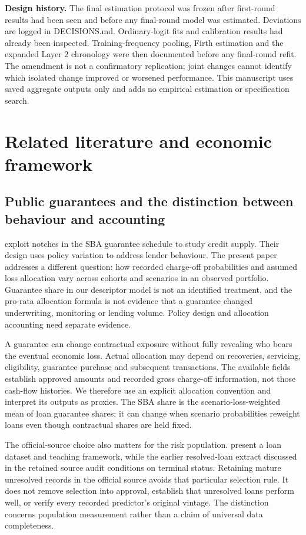 \textbf{Design history.} The final estimation protocol was frozen after first-round results had been seen and before any final-round model was estimated. Deviations are logged in DECISIONS.md. Ordinary-logit fits and calibration results had already been inspected. Training-frequency pooling, Firth estimation and the expanded Layer 2 chronology were then documented before any final-round refit. The amendment is not a confirmatory replication; joint changes cannot identify which isolated change improved or worsened performance. This manuscript uses saved aggregate outputs only and adds no empirical estimation or specification search.

\section{Related literature and economic framework}
\subsection{Public guarantees and the distinction between behaviour and accounting}
\citet{bachas2021} exploit notches in the SBA guarantee schedule to study credit supply. Their design uses policy variation to address lender behaviour. The present paper addresses a different question: how recorded charge-off probabilities and assumed loss allocation vary across cohorts and scenarios in an observed portfolio. Guarantee share in our descriptor model is not an identified treatment, and the pro-rata allocation formula is not evidence that a guarantee changed underwriting, monitoring or lending volume. Policy design and allocation accounting need separate evidence.

A guarantee can change contractual exposure without fully revealing who bears the eventual economic loss. Actual allocation may depend on recoveries, servicing, eligibility, guarantee purchase and subsequent transactions. The available fields establish approved amounts and recorded gross charge-off information, not those cash-flow histories. We therefore use an explicit allocation convention and interpret its outputs as proxies. The SBA share is the scenario-loss-weighted mean of loan guarantee shares; it can change when scenario probabilities reweight loans even though contractual shares are held fixed.

The official-source choice also matters for the risk population. \citet{li} present a loan dataset and teaching framework, while the earlier resolved-loan extract discussed in the retained source audit conditions on terminal status. Retaining mature unresolved records in the official source avoids that particular selection rule. It does not remove selection into approval, establish that unresolved loans perform well, or verify every recorded predictor's original vintage. The distinction concerns population measurement rather than a claim of universal data completeness.

